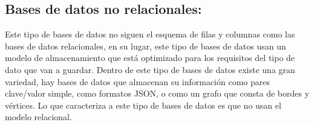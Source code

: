 \subsection{Bases de datos no relacionales:}
Este tipo de bases de datos no siguen el esquema de filas y columnas como las bases de datos relacionales, en su lugar, este tipo de bases de datos usan un modelo de almacenamiento que está optimizado para los requisitos del tipo de dato que van a guardar. Dentro de este tipo de bases de datos existe una gran variedad, hay bases de datos que almacenan su información como pares clave/valor simple, como formatos JSON, o como un grafo que consta de bordes y vértices. Lo que caracteriza a este tipo de bases de datos es que no usan el modelo relacional. \cite{CitaAJ12}

